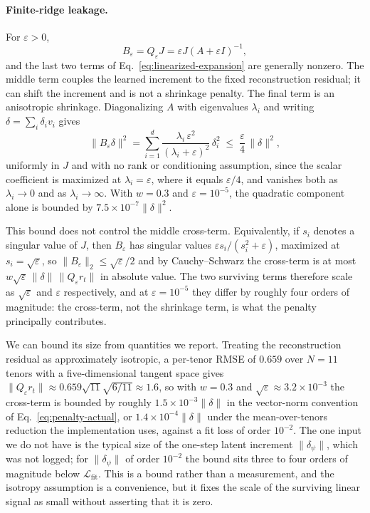 \documentclass{article} %
\begin{document}
\paragraph{Finite-ridge leakage.} For $\varepsilon>0$,
\begin{equation}
  B_\varepsilon=Q_\varepsilon J
  =\varepsilon J(A+\varepsilon I)^{-1},
  \label{eq:offtangent}
\end{equation}
and the last two terms of Eq.~\eqref{eq:linearized-expansion} are generally nonzero.
The middle term couples the learned increment to the fixed reconstruction residual;
it can shift the increment and is not a shrinkage penalty. The final term is an
anisotropic shrinkage. Diagonalizing $A$ with eigenvalues $\lambda_i$ and writing
$\delta=\sum_i\delta_i v_i$ gives
\begin{equation}
  \lVert B_\varepsilon\delta\rVert^2
  = \sum_{i=1}^{d} \frac{\lambda_i\,\varepsilon^2}{(\lambda_i+\varepsilon)^2}\,
  \delta_i^2
  \;\leq\; \frac{\varepsilon}{4}\,\lVert\delta\rVert^2 ,
  \label{eq:spectral}
\end{equation}
uniformly in $J$ and with no rank or conditioning assumption, since the scalar
coefficient is maximized at $\lambda_i = \varepsilon$, where it equals
$\varepsilon/4$, and vanishes both as $\lambda_i \to 0$ and as
$\lambda_i \to \infty$. With $w=0.3$ and $\varepsilon=10^{-5}$, the quadratic
component alone is bounded by
$7.5\times10^{-7}\lVert\delta\rVert^2$.

This bound does not control the middle cross-term. Equivalently, if $s_i$ denotes a
singular value of $J$, then $B_\varepsilon$ has singular values
$\varepsilon s_i/(s_i^2+\varepsilon)$, maximized at $s_i=\sqrt{\varepsilon}$, so
$\lVert B_\varepsilon\rVert_2\leq\sqrt{\varepsilon}/2$ and by Cauchy--Schwarz the
cross-term is at most
$w\sqrt{\varepsilon}\,\lVert\delta\rVert\,\lVert Q_\varepsilon r_t\rVert$ in absolute
value. The two surviving terms therefore scale as $\sqrt{\varepsilon}$ and
$\varepsilon$ respectively, and at $\varepsilon=10^{-5}$ they differ by roughly four
orders of magnitude: the cross-term, not the shrinkage term, is what the penalty
principally contributes.

We can bound its size from quantities we report. Treating the reconstruction residual
as approximately isotropic, a per-tenor RMSE of $0.659$ over $N{=}11$ tenors with a
five-dimensional tangent space gives
$\lVert Q_\varepsilon r_t\rVert\approx0.659\sqrt{11}\sqrt{6/11}\approx1.6$, so with
$w=0.3$ and $\sqrt{\varepsilon}\approx3.2\times10^{-3}$ the cross-term is bounded by
roughly $1.5\times10^{-3}\lVert\delta\rVert$ in the vector-norm convention of
Eq.~\eqref{eq:penalty-actual}, or $1.4\times10^{-4}\lVert\delta\rVert$ under the
mean-over-tenors reduction the implementation uses, against a fit loss of order
$10^{-2}$. The one input we do not have is the typical size of the one-step latent
increment $\lVert\delta_\psi\rVert$, which was not logged; for
$\lVert\delta_\psi\rVert$ of order $10^{-2}$ the bound sits three to four orders of
magnitude below $\mathcal{L}_{\mathrm{fit}}$. This is a bound rather than a
measurement, and the isotropy assumption is a convenience, but it fixes the scale of
the surviving linear signal as small without asserting that it is zero.
\end{document}

